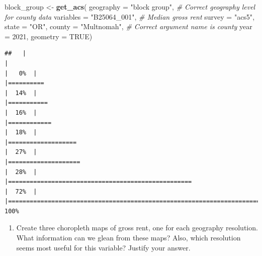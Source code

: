\documentclass[
]{article}
\newenvironment{Shaded}{\begin{snugshade}}{\end{snugshade}}
\newcommand{\AttributeTok}[1]{\textcolor[rgb]{0.13,0.29,0.53}{#1}}
\newcommand{\CommentTok}[1]{\textcolor[rgb]{0.56,0.35,0.01}{\textit{#1}}}
\newcommand{\ConstantTok}[1]{\textcolor[rgb]{0.56,0.35,0.01}{#1}}
\newcommand{\DecValTok}[1]{\textcolor[rgb]{0.00,0.00,0.81}{#1}}
\newcommand{\FunctionTok}[1]{\textcolor[rgb]{0.13,0.29,0.53}{\textbf{#1}}}
\newcommand{\NormalTok}[1]{#1}
\newcommand{\OtherTok}[1]{\textcolor[rgb]{0.56,0.35,0.01}{#1}}
\newcommand{\StringTok}[1]{\textcolor[rgb]{0.31,0.60,0.02}{#1}}
\providecommand{\tightlist}{%
  \setlength{\itemsep}{0pt}\setlength{\parskip}{0pt}}
\begin{document}
\begin{Shaded}
\begin{Highlighting}[]
\NormalTok{block\_group }\OtherTok{\textless{}{-}} \FunctionTok{get\_acs}\NormalTok{(}
  \AttributeTok{geography =} \StringTok{"block group"}\NormalTok{, }\CommentTok{\# Correct geography level for county data}
  \AttributeTok{variables =} \StringTok{"B25064\_001"}\NormalTok{, }\CommentTok{\# Median gross rent}
  \AttributeTok{survey =} \StringTok{"acs5"}\NormalTok{, }
  \AttributeTok{state =} \StringTok{"OR"}\NormalTok{,}
  \AttributeTok{county =} \StringTok{"Multnomah"}\NormalTok{, }\CommentTok{\# Correct argument name is \textquotesingle{}county\textquotesingle{}}
  \AttributeTok{year =} \DecValTok{2021}\NormalTok{,}
  \AttributeTok{geometry =} \ConstantTok{TRUE}\NormalTok{)}
\end{Highlighting}
\end{Shaded}

\begin{verbatim}
##   |                                                                              |                                                                      |   0%  |                                                                              |==========                                                            |  14%  |                                                                              |===========                                                           |  16%  |                                                                              |============                                                          |  18%  |                                                                              |===================                                                   |  27%  |                                                                              |====================                                                  |  28%  |                                                                              |===================================================                   |  72%  |                                                                              |======================================================================| 100%
\end{verbatim}

\begin{enumerate}
\def\labelenumi{\alph{enumi}.}
\setcounter{enumi}{1}
\tightlist
\item
  Create three choropleth maps of gross rent, one for each geography
  resolution. What information can we glean from these maps? Also, which
  resolution seems most useful for this variable? Justify your answer.
\end{enumerate}
\end{document}
